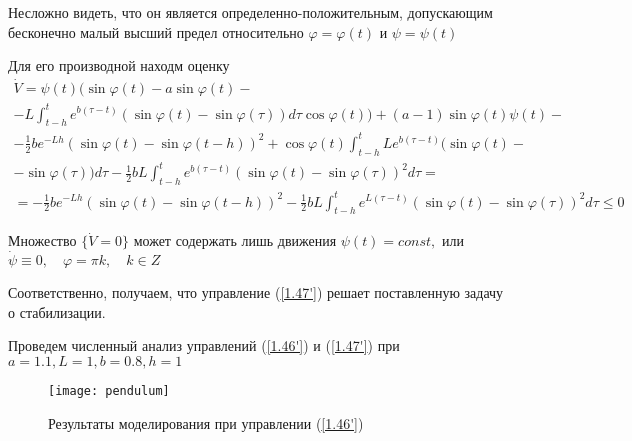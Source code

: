 Несложно видеть, что он является определенно-положительным, допускающим бесконечно малый высший предел относительно $\varphi = \varphi (t)$ и $\psi = \psi (t)$

Для его производной находм оценку
$$
\begin{array}{c}
\displaystyle \dot V = \psi (t) (\sin \varphi (t) - a \sin \varphi (t) -\\
\displaystyle - L \int_{t-h}^{t} e^{b (\tau - t)} (\sin \varphi (t) - \sin \varphi (\tau)) d \tau \cos \varphi (t)) + (a - 1) \sin \varphi (t) \psi (t)-\\
\displaystyle - \frac12 b e^{- L h} (\sin \varphi (t) - \sin \varphi (t - h))^2 + \cos \varphi (t) \int_{t-h}^{t} L e^{b (\tau - t)} (\sin \varphi (t)-\\
\displaystyle - \sin \varphi (\tau)) d \tau - \frac12 b L \int_{t-h}^{t} e^{b (\tau - t)} (\sin \varphi (t) - \sin \varphi (\tau))^2 d \tau =\\
\displaystyle = - \frac12 b e^{- L h} (\sin \varphi (t) - \sin \varphi (t - h))^2 - \frac12 b L \int_{t-h}^{t} e^{L (\tau - t)} (\sin \varphi (t) - \sin \varphi (\tau))^2 d \tau \le 0
\end{array}
$$

Множество $\{ \dot V = 0 \}$ может содержать лишь движения $\psi (t) = const,$ или $\dot \psi \equiv 0, \quad \varphi = \pi k, \quad k \in Z$

Соответственно, получаем, что управление (\ref{1.47'}) решает поставленную задачу о стабилизации.

Проведем численный анализ управлений (\ref{1.46'}) и (\ref{1.47'}) при $a = 1.1, L = 1, b = 0.8, h = 1$

\begin{figure}[h]
	\centering
	\texttt{[image: pendulum]}
	\caption{Результаты моделирования при управлении (\ref{1.46'})}
	\label{fig:pendulum_1}
\end{figure}
